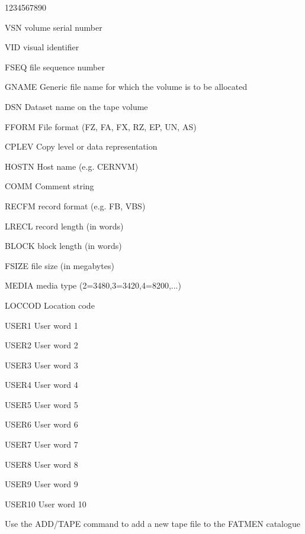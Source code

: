 \begin{DLtt}{1234567890}
\item[VSN]volume serial number
\item[VID]visual identifier
\item[FSEQ]file sequence number
\item[GNAME]Generic file name for which the volume is to be allocated
\item[DSN]Dataset name on the tape volume
\item[FFORM]File format (FZ, FA, FX, RZ, EP, UN, AS)
\item[CPLEV]Copy level or data representation
\item[HOSTN]Host name (e.g. CERNVM)
\item[COMM]Comment string 
\item[RECFM]record format (e.g. FB, VBS)
\item[LRECL]record length (in words)
\item[BLOCK]block length (in words)
\item[FSIZE]file size (in megabytes)
\item[MEDIA]media type (2=3480,3=3420,4=8200,...)
\item[LOCCOD]Location code
\item[USER1]User word 1
\item[USER2]User word 2
\item[USER3]User word 3
\item[USER4]User word 4
\item[USER5]User word 5
\item[USER6]User word 6
\item[USER7]User word 7
\item[USER8]User word 8
\item[USER9]User word 9
\item[USER10]User word 10
\end{DLtt}
Use the ADD/TAPE command to add a new tape file to the FATMEN catalogue
 
